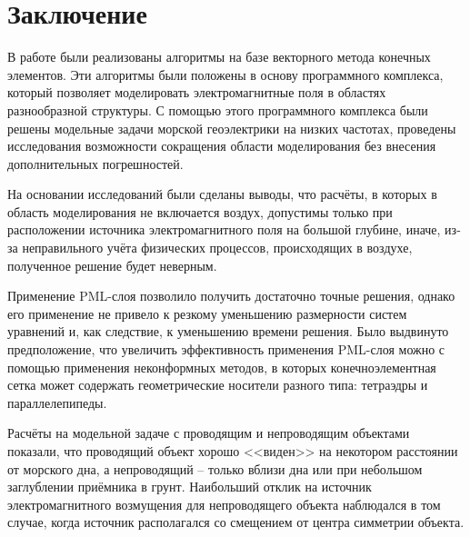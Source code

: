 \documentclass[a4paper,14pt]{article}
\begin{document}

\clearpage
{}
\section*{Заключение}
В работе были реализованы алгоритмы на базе векторного метода конечных элементов. Эти алгоритмы были положены в основу программного комплекса, который позволяет моделировать электромагнитные поля в областях разнообразной структуры. С помощью этого программного комплекса были решены модельные задачи морской геоэлектрики на низких частотах, проведены исследования возможности сокращения области моделирования без внесения дополнительных погрешностей.

На основании исследований были сделаны выводы, что расчёты, в которых в область моделирования не включается воздух, допустимы только при расположении источника электромагнитного поля на большой глубине, иначе, из-за неправильного учёта физических процессов, происходящих в воздухе, полученное решение будет неверным.

Применение PML-слоя позволило получить достаточно точные решения, однако его применение не привело к резкому уменьшению размерности систем уравнений и, как следствие, к уменьшению времени решения. Было выдвинуто предположение, что увеличить эффективность применения PML-слоя можно с помощью применения неконформных методов, в которых конечноэлементная сетка может содержать геометрические носители разного типа: тетраэдры и параллелепипеды.

Расчёты на модельной задаче с проводящим и непроводящим объектами показали, что проводящий объект хорошо <<виден>> на некотором расстоянии от морского дна, а непроводящий -- только вблизи дна или при небольшом заглублении приёмника в грунт. Наибольший отклик на источник электромагнитного возмущения для непроводящего объекта наблюдался в том случае, когда источник располагался со смещением от центра симметрии объекта.


\clearpage
{}

\end{document}
